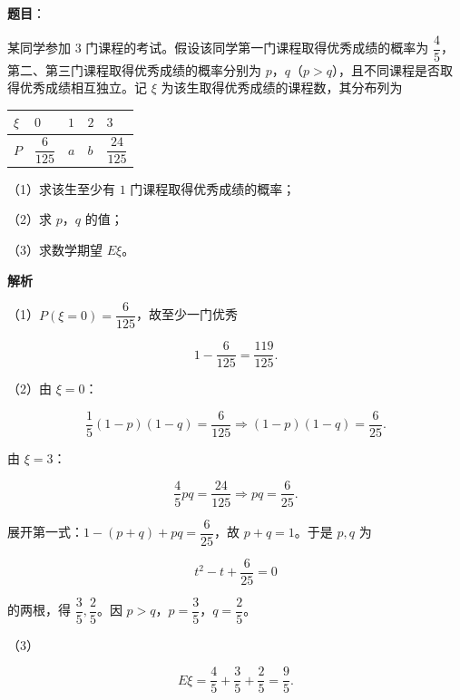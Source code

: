 \begin{answer}

\textbf{题目}：

某同学参加 $3$ 门课程的考试。假设该同学第一门课程取得优秀成绩的概率为 $\dfrac45$，第二、第三门课程取得优秀成绩的概率分别为 $p$，$q$（$p>q$），且不同课程是否取得优秀成绩相互独立。记 $\xi$ 为该生取得优秀成绩的课程数，其分布列为

\begin{center}
\begin{tabular}{lllll}
\toprule
$\xi$ & $0$ & $1$ & $2$ & $3$ \\
\midrule
$P$ & $\dfrac6{125}$ & $a$ & $b$ & $\dfrac{24}{125}$ \\
\bottomrule
\end{tabular}
\end{center}

（1）求该生至少有 $1$ 门课程取得优秀成绩的概率；

（2）求 $p$，$q$ 的值；

（3）求数学期望 $E\xi$。

\textbf{解析}

（1）$P(\xi=0)=\dfrac6{125}$，故至少一门优秀

\nopagebreak[4]
\[1-\frac6{125}=\frac{119}{125}.\]

（2）由 $\xi=0$：

\nopagebreak[4]
\[\frac15(1-p)(1-q)=\frac6{125}\Longrightarrow(1-p)(1-q)=\frac6{25}.\]

由 $\xi=3$：

\nopagebreak[4]
\[\frac45pq=\frac{24}{125}\Longrightarrow pq=\frac6{25}.\]

展开第一式：$1-(p+q)+pq=\dfrac6{25}$，故 $p+q=1$。于是 $p,q$ 为

\nopagebreak[4]
\[t^2-t+\frac6{25}=0\]

的两根，得 $\dfrac35,\dfrac25$。因 $p>q$，$p=\dfrac35$，$q=\dfrac25$。

（3）

\nopagebreak[4]
\[E\xi=\frac45+\frac35+\frac25=\frac95.\]


\end{answer}
